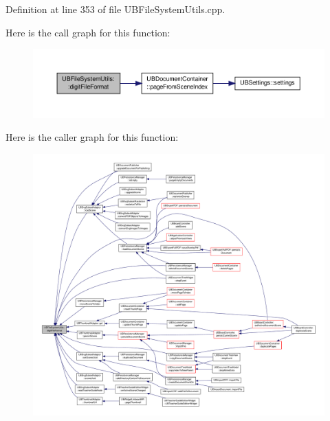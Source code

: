 Definition at line 353 of file U\-B\-File\-System\-Utils.\-cpp.



Here is the call graph for this function\-:
\nopagebreak
\begin{figure}[H]
\begin{center}
\leavevmode
\includegraphics[width=350pt]{d2/d7a/class_u_b_file_system_utils_a9ac90c91a836a34b5ccec620d8e4273a_cgraph}
\end{center}
\end{figure}




Here is the caller graph for this function\-:
\nopagebreak
\begin{figure}[H]
\begin{center}
\leavevmode
\includegraphics[width=350pt]{d2/d7a/class_u_b_file_system_utils_a9ac90c91a836a34b5ccec620d8e4273a_icgraph}
\end{center}
\end{figure}


